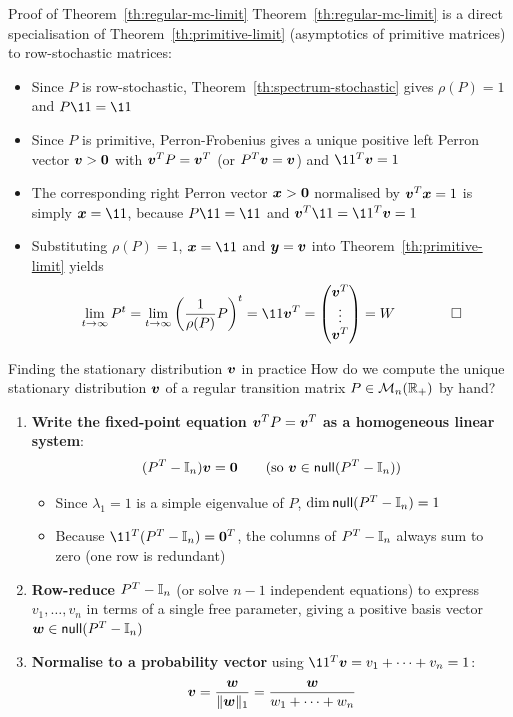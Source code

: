 \documentclass[aspectratio=169]{beamer}\usepackage[]{graphicx}\usepackage[]{xcolor}
\begin{document}
\begin{frame}{Proof of Theorem~\ref{th:regular-mc-limit}}
Theorem~\ref{th:regular-mc-limit} is a direct specialisation of Theorem~\ref{th:primitive-limit} (asymptotics of primitive matrices) to row-stochastic matrices:
\vfill
\begin{itemize}
\item Since $P$ is row-stochastic, Theorem~\ref{th:spectrum-stochastic} gives $\rho(P) = 1$ and $P\11 = \11$
\item Since $P$ is primitive, Perron-Frobenius gives a unique positive left Perron vector $\bv > \b0$ with $\bm{v}^T P = \bm{v}^T$ (or $P^T\bm{v} = \bm{v}$) and $\11^T\bv = 1$
\item The corresponding right Perron vector $\bx > \b0$ normalised by $\bm{v}^T\bm{x} = 1$ is simply $\bx = \11$, because $P\11 = \11$ and $\bv^T\11 = \11^T\bv = 1$
\item Substituting $\rho(P) = 1$, $\bx = \11$ and $\bm{y} = \bm{v}$ into Theorem~\ref{th:primitive-limit} yields
\[
\lim_{t \to \infty} P^t = \lim_{t \to \infty} \left(\frac{1}{\rho(P)} P\right)^t = \11 \bv^T = \begin{pmatrix} \bv^T \\ \vdots \\ \bv^T \end{pmatrix} = W \qquad \qed
\]
\end{itemize}
\end{frame}

\begin{frame}{Finding the stationary distribution $\bm{v}$ in practice}
How do we compute the unique stationary distribution $\bm{v}$ of a regular transition matrix $P \in \mathcal{M}_n(\mathbb{R}_+)$ by hand?
\vfill
\begin{enumerate}
\item \textbf{Write the fixed-point equation $\bm{v}^T P = \bm{v}^T$ as a homogeneous linear system}:
\[
(P^T - \II_n)\bv = \b0 \qquad (\text{so } \bv \in \nullspace(P^T - \II_n))
\]
\begin{itemize}
\item Since $\lambda_1 = 1$ is a simple eigenvalue of $P$, $\dim\mathsf{null}(P^T - \mathbb{I}_n) = 1$
\item Because $\11^T(P^T - \II_n) = \b0^T$, the columns of $P^T - \mathbb{I}_n$ always sum to zero (one row is redundant)
\end{itemize}
\item \textbf{Row-reduce $P^T - \mathbb{I}_n$} (or solve $n-1$ independent equations) to express $v_1, \ldots, v_n$ in terms of a single free parameter, giving a positive basis vector $\bm{w} \in \mathsf{null}(P^T - \mathbb{I}_n)$
\item \textbf{Normalise to a probability vector} using $\11^T\bv = v_1 + \cdots + v_n = 1$:
\[
\bm{v} = \frac{\bm{w}}{\|\bm{w}\|_1} = \frac{\bm{w}}{w_1 + \cdots + w_n}
\]
\end{enumerate}
\end{frame}
\end{document}
